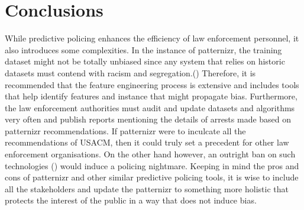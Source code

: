 \documentclass[a4paper,14pt]{extarticle}
\begin{document}
\section*{Conclusions}
\begin{justifying}
	While predictive policing enhances the efficiency of law enforcement personnel, it also introduces some complexities. In the instance of patternizr, the training dataset might not be totally unbiased since any system that relies on historic datasets must contend with racism and segregation.(\cite{Griffard19}) Therefore, it is recommended that the feature engineering process is extensive and includes tools that help identify features and instance that might propagate bias. Furthermore, the law enforcement authorities must audit and update datasets and algorithms very often and publish reports mentioning the details of arrests made based on patternizr recommendations. If patternizr were to inculcate all the recommendations of USACM, then it could truly set a precedent for other law enforcement organisations. On the other hand however, an outright ban on such technologies (\cite{Griffard19}) would induce a policing nightmare. Keeping in mind the pros and cons of patternizr and other similar predictive policing tools, it is wise to include all the stakeholders and update the patternizr to something more holistic that protects the interest of the public in a way that does not induce bias.
	\end{justifying}
\pagebreak
\printbibliography[title = Bibliography]
\end{document}
